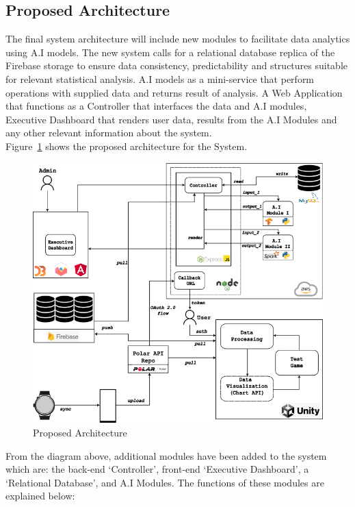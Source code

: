 \documentclass{report}
\begin{document}
    \subsection*{Proposed Architecture}
    The final system architecture will include new modules to facilitate data analytics using A.I models. The new system calls 
    for a relational database replica of the Firebase storage to ensure data consistency, predictability and structures suitable
    for relevant statistical analysis. A.I models as a mini-service that perform operations with supplied data and returns result
    of analysis. A Web Application that functions as a Controller that interfaces the data and A.I modules, Executive Dashboard 
    that renders user data, results from the A.I Modules and any other relevant information about the system.\\
    Figure~\ref{fig:proposed-web-architecture} shows the proposed architecture for the System.
    \begin{figure}[h]
        \includegraphics[scale=0.675]{images/proposed-architecture.png}
        \caption{Proposed Architecture}
        \label{fig:proposed-web-architecture}
    \end{figure}
    From the diagram above, additional modules have been added to the system which are: the back-end `Controller', front-end 
    `Executive Dashboard', a `Relational Database', and A.I Modules. The functions of these modules are explained below:
\end{document}
